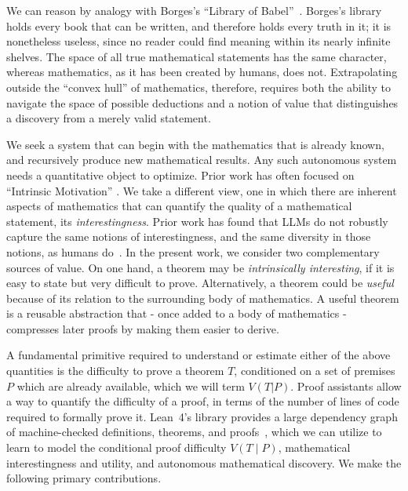 We can reason by analogy with Borges's ``Library of Babel''~\citep{borges1962library,litt2026babel}.
%
Borges's library holds every book that can be written, and therefore holds every truth in it; it is nonetheless useless, since no reader could find meaning within its nearly infinite shelves.
%
The space of all true mathematical statements has the same character, whereas mathematics, as it has been created by humans, does not.
%
Extrapolating outside the ``convex hull'' of mathematics, therefore, requires both the ability to navigate the space of possible deductions and a notion of value that distinguishes a discovery from a merely valid statement.

%
We seek a system that can begin with the mathematics that is already known, and recursively produce new mathematical results.
%
Any such autonomous system needs a quantitative object to optimize.
%
Prior work has often focused on ``Intrinsic Motivation'' \citep{poesia2024minimo, tsoukalas2025fermat}.
%
We take a different view, one in which there are inherent aspects of mathematics that can quantify the quality of a mathematical statement, its {\em interestingness}.
%
Prior work has found that LLMs do not robustly capture the same notions of interestingness, and the same diversity in those notions, as humans do~\citep{mishra2025matter}.
%
In the present work, we consider two complementary sources of value. On one hand, a theorem may be \emph{intrinsically interesting}, if it is easy to state but very difficult to prove.
%
Alternatively, a theorem could be \emph{useful} because of its relation to the surrounding body of mathematics.
%
A useful theorem is a reusable abstraction that -  once added to a body of mathematics -  compresses later proofs by making them easier to derive.

A fundamental primitive required to understand or estimate either of the above quantities is the difficulty to prove a theorem $T$, conditioned on a set of premises $P$ which are already available, which we will term $V(T|P)$.
%
Proof assistants \citep{moura2021lean4} allow a way to quantify the difficulty of a proof, in terms of the number of lines of code required to formally prove it. 
%
Lean~4's library \Mathlib provides a large dependency graph of machine-checked definitions, theorems, and proofs~\citep{mathlib2020}, which we can utilize to learn to model the conditional proof difficulty $V(T\mid P)$, mathematical interestingness and utility, and autonomous mathematical discovery. 
%
We make the following primary contributions.

